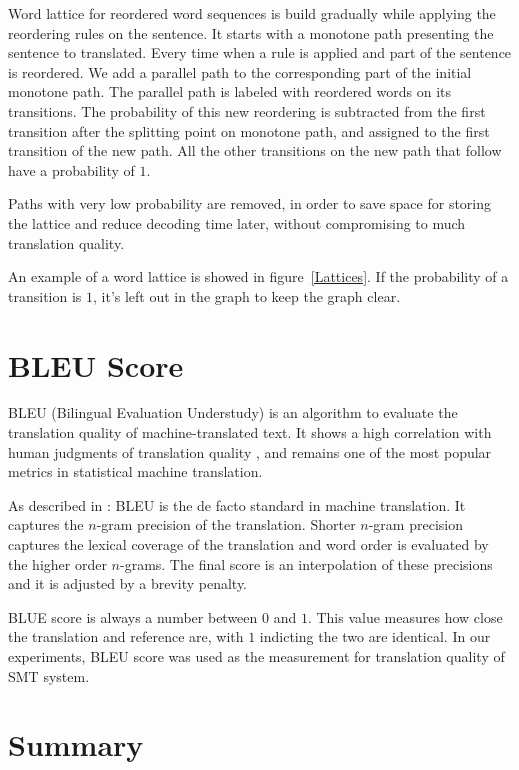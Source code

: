 Word lattice for reordered word sequences is build gradually while applying the reordering rules on the sentence. It starts with a monotone path presenting the sentence to translated. Every time when a rule is applied and part of the sentence is reordered. We add a parallel path to the corresponding part of the initial monotone path. The parallel path is labeled with reordered words on its transitions. The probability of this new reordering is subtracted from the first transition after the splitting point on monotone path, and assigned to the first transition of the new path. All the other transitions on the new path that follow have a probability of $1$.

Paths with very low probability are removed, in order to save space for storing the lattice and reduce decoding time later, without compromising to much translation quality. 

An example of a word lattice is showed in figure~\ref{Lattices}. If the probability of a transition is $1$, it's left out in the graph to keep the graph clear.

\section{BLEU Score}
\label{ch:Foundations:sec:bleu}

BLEU (Bilingual Evaluation Understudy) is an algorithm to evaluate the translation quality of machine-translated text. It shows a high correlation with human judgments of translation quality \citep{bleuscore}, and remains one of the most popular metrics in statistical machine translation.

As described in \cite{metrics}: BLEU is the de facto standard in machine translation. It captures the $n$-gram precision of the translation. Shorter $n$-gram precision captures the lexical coverage of the translation and word order is evaluated by the higher order $n$-grams. The final score is an interpolation of these precisions and it is adjusted by a brevity penalty.

BLUE score is always a number between $0$ and $1$. This value measures how close the translation and reference are, with $1$ indicting the two are identical. In our experiments, BLEU score was used as the measurement for translation quality of SMT system.

\section{Summary}

